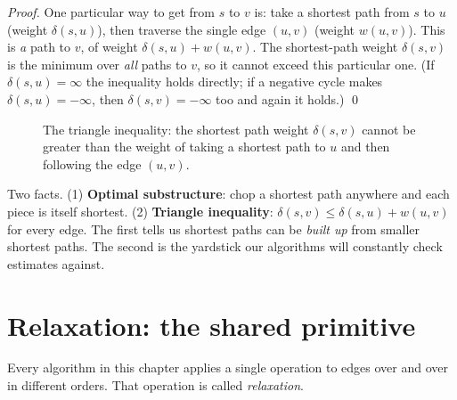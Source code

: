 \begin{formalbox}
\emph{Proof.} One particular way to get from $s$ to $v$ is: take a shortest path
from $s$ to $u$ (weight $\delta(s,u)$), then traverse the single edge $(u,v)$
(weight $w(u,v)$). This is \emph{a} path to $v$, of weight $\delta(s,u)+w(u,v)$.
The shortest-path weight $\delta(s,v)$ is the minimum over \emph{all} paths to
$v$, so it cannot exceed this particular one. (If $\delta(s,u) = \infty$ the
inequality holds directly; if a negative cycle makes $\delta(s,u) = -\infty$, then
$\delta(s,v) = -\infty$ too and again it holds.) \qed
\end{formalbox}

\begin{figure}[htbp]
\centering
{}
\caption{The triangle inequality: the shortest path weight $\delta(s,v)$ cannot be greater than the weight of taking a shortest path to $u$ and then following the edge $(u,v)$.}
\label{ch24:fig-triangle}
\end{figure}

\begin{focusbox}
Two facts. (1) \textbf{Optimal substructure}: chop a shortest path anywhere and
each piece is itself shortest. (2) \textbf{Triangle inequality}:
$\delta(s,v) \le \delta(s,u) + w(u,v)$ for every edge. The first tells us shortest
paths can be \emph{built up} from smaller shortest paths. The second is the
yardstick our algorithms will constantly check estimates against.
\end{focusbox}

\section{Relaxation: the shared primitive}

Every algorithm in this chapter applies a single operation to edges over and
over in different orders. That operation is called \emph{relaxation}.

